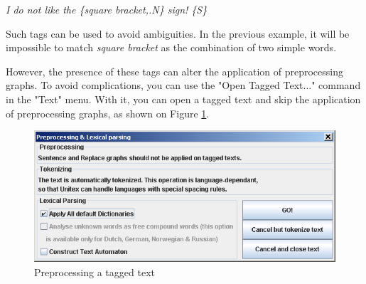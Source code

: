 \bigskip
\textit{I do not like the \{square bracket,.N\} sign! \{S\}}

\bigskip
\noindent Such tags can be used to avoid ambiguities. In the previous example,
it will be impossible to match \textit{square bracket} as the combination of two
simple words.

\bigskip
\noindent However, the presence of these tags can alter the application of
preprocessing graphs. To avoid complications, you can use the "Open Tagged
Text..." command in the "Text" menu. With it, you can open a tagged text and skip
the application of preprocessing graphs, as shown on Figure
\ref{preprocess-tagged-text}.

\bigskip
\begin{figure}[!h]
\begin{center}
\includegraphics[width=14cm]{resources/img/fig2-15.png}
\caption{Preprocessing a tagged text\label{preprocess-tagged-text}}
\end{center}
\end{figure}
